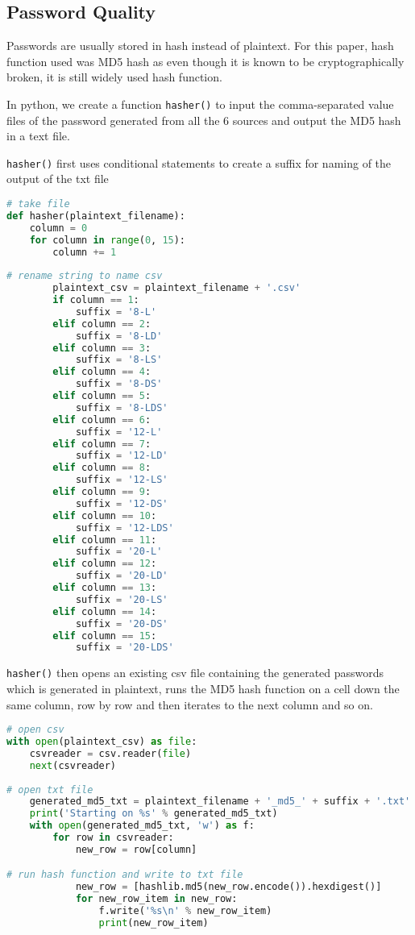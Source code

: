 \documentclass[letterpaper,twocolumn,10pt]{article}
\begin{document}
\subsection{Password Quality}
Passwords are usually stored in hash instead of plaintext. For this paper, hash function used was MD5 hash as even though it is known to be cryptographically broken, it is still widely used hash function.

In python, we create a function \lstinline{hasher()} to input the comma-separated value files of the password generated from all the 6 sources and output the MD5 hash in a text file.

\lstinline{hasher()} first uses conditional statements to create a suffix for naming of the output of the txt file

\begin{lstlisting}[language=python, frame=none]
# take file
def hasher(plaintext_filename):
    column = 0
    for column in range(0, 15):
        column += 1
        
# rename string to name csv
        plaintext_csv = plaintext_filename + '.csv'
        if column == 1:
            suffix = '8-L'
        elif column == 2:
            suffix = '8-LD'
        elif column == 3:
            suffix = '8-LS'   
        elif column == 4:
            suffix = '8-DS'
        elif column == 5:
            suffix = '8-LDS' 
        elif column == 6:
            suffix = '12-L'
        elif column == 7:
            suffix = '12-LD'         
        elif column == 8:
            suffix = '12-LS'
        elif column == 9:
            suffix = '12-DS'         
        elif column == 10:
            suffix = '12-LDS'
        elif column == 11:
            suffix = '20-L'         
        elif column == 12:
            suffix = '20-LD'
        elif column == 13:
            suffix = '20-LS'         
        elif column == 14:
            suffix = '20-DS'
        elif column == 15:
            suffix = '20-LDS'   
\end{lstlisting}

\lstinline{hasher()} then opens an existing csv file containing the generated passwords which is generated in plaintext, runs the MD5 hash function on a cell down the same column, row by row and then iterates to the next column and so on.

\begin{lstlisting}[language=python, frame=none]
# open csv
with open(plaintext_csv) as file:
    csvreader = csv.reader(file)
    next(csvreader)
    
# open txt file 
    generated_md5_txt = plaintext_filename + '_md5_' + suffix + '.txt'
    print('Starting on %s' % generated_md5_txt)
    with open(generated_md5_txt, 'w') as f:
        for row in csvreader:
            new_row = row[column]

# run hash function and write to txt file
            new_row = [hashlib.md5(new_row.encode()).hexdigest()]
            for new_row_item in new_row:
                f.write('%s\n' % new_row_item)
                print(new_row_item)
\end{lstlisting}
\end{document}
